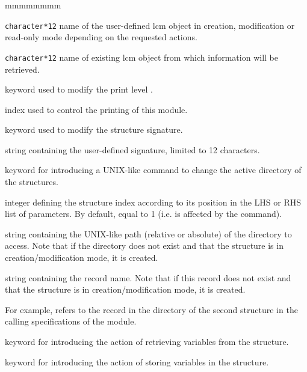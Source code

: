 \begin{ListeDeDescription}{mmmmmmmm}

\item[\dusa{STRUCT}] {\tt character*12} name of the user-defined {\sc lcm} object in creation, modification or read-only mode depending on the requested actions.

\item[\dusa{EXTSTR}] {\tt character*12} name of existing {\sc lcm} object from which information will be retrieved.

\item[\moc{EDIT}] keyword used to modify the print level .

\item[\dusa{iprint}] index used to control the printing of this module.

\item[\moc{TYPE}] keyword used to modify the structure signature.

\item[\dusa{type}] string containing the user-defined signature, limited to 12 characters.

\item[\moc{CD}] keyword for introducing a UNIX-like command to change the active directory of the structures.
\item[\dusa{ilcm}] integer defining the structure index according to its position in the LHS or RHS list of parameters. By default, equal to 1 (i.e.  is affected by the  command).

\item[\dusa{path}] string containing the UNIX-like path (relative or absolute) of the directory to access. Note that if the directory does not exist and that the structure is in creation/modification mode, it is created.

\item[\dusa{recname}] string containing the record name. Note that if this record does not exist and that the structure is in creation/modification mode, it is created.

For example,  refers to the record  in the directory  of the second structure in the calling specifications of the module.

\item[\moc{GET}] keyword for introducing the action of retrieving variables from the structure.

\item[\moc{PUT}] keyword for introducing the action of storing variables in the structure.


\end{ListeDeDescription}
